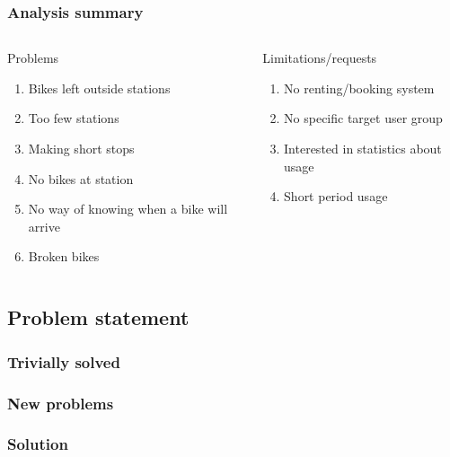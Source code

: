 \begin{frame}
\frametitle{Analysis summary}
\begin{columns}
\begin{column}{.45\textwidth}
\begin{block}{Problems}
\begin{enumerate}
\item Bikes left outside stations
\item Too few stations
\item Making short stops
\item No bikes at station
\item No way of knowing when a bike will arrive
\item Broken bikes
\end{enumerate}
\end{block}
\end{column}
\begin{column}{.45\textwidth}
\begin{block}{Limitations/requests}
\begin{enumerate}
\item No renting/booking system
\item No specific target user group
\item Interested in statistics about usage
\item Short period usage
\end{enumerate}
\end{block}
\end{column}
\end{columns}
\end{frame}

\subsection{Problem statement}

\begin{frame}
\frametitle{Trivially solved}

\end{frame}

\begin{frame}
\frametitle{New problems}

\end{frame}

\begin{frame}
\frametitle{Solution}

\end{frame}